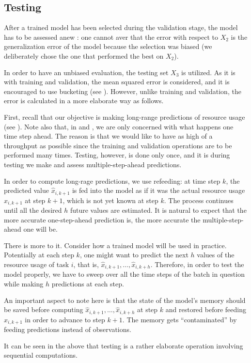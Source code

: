 \subsection{Testing}
After a trained model has been selected during the validation stage, the model
has to be assessed anew \cite{hastie2009}: one cannot aver that the error with
respect to $X_2$ is the generalization error of the model because the selection
was biased (we deliberately chose the one that performed the best on $X_2$).

In order to have an unbiased evaluation, the testing set $X_3$ is utilized. As
it is with training and validation, the mean squared error is considered, and it
is encouraged to use bucketing (see ). However, unlike training
and validation, the error is calculated in a more elaborate way as follows.

First, recall that our objective is making long-range predictions of resource
usage (see ). Note also that, in  and
, we are only concerned with what happens one time step ahead.
The reason is that we would like to have as high of a throughput as possible
since the training and validation operations are to be performed many times.
Testing, however, is done only once, and it is during testing we make and assess
multiple-step-ahead predictions.

In order to compute long-rage predictions, we use refeeding: at time step $k$,
the predicted value $\hat{x}_{i,k + 1}$ is fed into the model as if it was the
actual resource usage $x_{i,k + 1}$ at step $k + 1$, which is not yet known at
step $k$. The process continues until all the desired $h$ future values are
estimated. It is natural to expect that the more accurate one-step-ahead
prediction is, the more accurate the multiple-step-ahead one will be.

There is more to it. Consider how a trained model will be used in practice.
Potentially at each step $k$, one might want to predict the next $h$ values of
the resource usage of task $i$, that is, $\hat{x}_{i,k + 1}, \dots, \hat{x}_{i,k
+ h}$. Therefore, in order to test the model properly, we have to sweep over all
the time steps of the batch in question while making $h$ predictions at each
step.

An important aspect to note here is that the state of the model's memory should
be saved before computing $\hat{x}_{i,k + 1}, \dots, \hat{x}_{i,k + h}$ at step
$k$ and restored before feeding $x_{i,k + 1}$ in order to advance to step $k +
1$. The memory gets ``contaminated'' by feeding predictions instead of
observations.

It can be seen in the above that testing is a rather elaborate operation
involving sequential computations.
